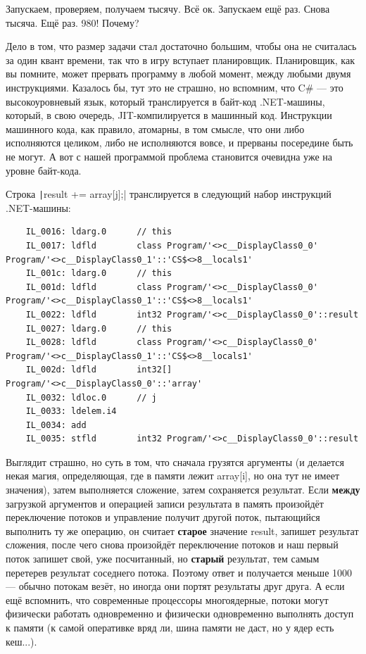 \documentclass[a5paper]{article}
\begin{document}
Запускаем, проверяем, получаем тысячу. Всё ок. Запускаем ещё раз. Снова тысяча. Ещё раз. 980! Почему?

Дело в том, что размер задачи стал достаточно большим, чтобы она не считалась за один квант времени, так что в игру вступает планировщик. Планировщик, как вы помните, может прервать программу в любой момент, между любыми двумя инструкциями. Казалось бы, тут это не страшно, но вспомним, что C\# --- это высокоуровневый язык, который транслируется в байт-код .NET-машины, который, в свою очередь, JIT-компилируется в машинный код. Инструкции машинного кода, как правило, атомарны, в том смысле, что они либо исполняются целиком, либо не исполняются вовсе, и прерваны посередине быть не могут. А вот с нашей программой проблема становится очевидна уже на уровне байт-кода.

Строка \texttt|result += array[j];| транслируется в следующий набор инструкций .NET-машины:

\begin{footnotesize}
    \begin{verbatim}
    IL_0016: ldarg.0      // this
    IL_0017: ldfld        class Program/'<>c__DisplayClass0_0' Program/'<>c__DisplayClass0_1'::'CS$<>8__locals1'
    IL_001c: ldarg.0      // this
    IL_001d: ldfld        class Program/'<>c__DisplayClass0_0' Program/'<>c__DisplayClass0_1'::'CS$<>8__locals1'
    IL_0022: ldfld        int32 Program/'<>c__DisplayClass0_0'::result
    IL_0027: ldarg.0      // this
    IL_0028: ldfld        class Program/'<>c__DisplayClass0_0' Program/'<>c__DisplayClass0_1'::'CS$<>8__locals1'
    IL_002d: ldfld        int32[] Program/'<>c__DisplayClass0_0'::'array'
    IL_0032: ldloc.0      // j
    IL_0033: ldelem.i4    
    IL_0034: add          
    IL_0035: stfld        int32 Program/'<>c__DisplayClass0_0'::result
    \end{verbatim}
\end{footnotesize}

Выглядит страшно, но суть в том, что сначала грузятся аргументы (и делается некая магия, определяющая, где в памяти лежит array[i], но она тут не имеет значения), затем выполняется сложение, затем сохраняется результат. Если \textbf{между} загрузкой аргументов и операцией записи результата в память произойдёт переключение потоков и управление получит другой поток, пытающийся выполнить ту же операцию, он считает \textbf{старое} значение result, запишет результат сложения, после чего снова произойдёт переключение потоков и наш первый поток запишет свой, уже посчитанный, но \textbf{старый} результат, тем самым перетерев результат соседнего потока. Поэтому ответ и получается меньше 1000 --- обычно потокам везёт, но иногда они портят результаты друг друга. А если ещё вспомнить, что современные процессоры многоядерные, потоки могут физически работать одновременно и физически одновременно выполнять доступ к памяти (к самой оперативке вряд ли, шина памяти не даст, но у ядер есть кеш...).
\end{document}
